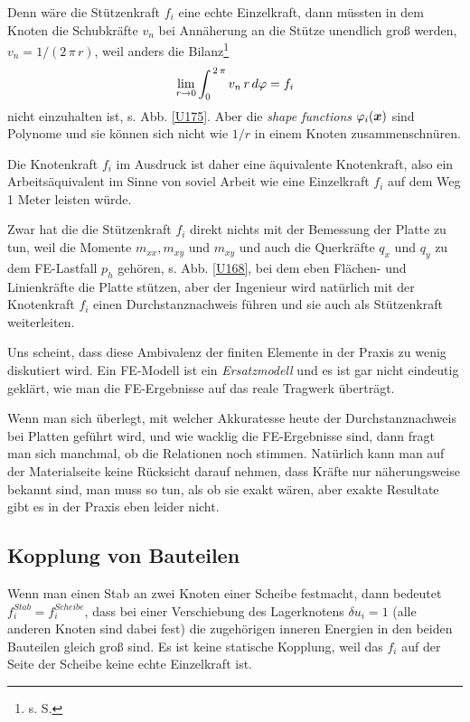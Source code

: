 Denn w\"{a}re die St\"{u}tzenkraft $f_i$ eine echte Einzelkraft, dann m\"{u}ssten in dem Knoten die Schubkr\"{a}fte $v_n$ bei Ann\"{a}herung an die St\"{u}tze unendlich gro{\ss} werden, $v_n = 1/(2\,\pi\,r)$, weil anders die Bilanz\footnote{s. S. \pageref{EinzelF}}
\begin{align}
\lim_{r \to 0} \int_0^{\,2\,\pi} v_n \,r\,d\varphi = f_i
\end{align}
nicht einzuhalten ist, s. Abb. \ref{U175}. Aber die {\em shape functions\/} $\varphi_i(\mbox{\boldmath $x$})$ sind Polynome und sie k\"{o}nnen sich nicht wie $1/r$ in einem Knoten zusammenschn\"{u}ren.

Die Knotenkraft $f_i$ im Ausdruck ist daher eine \"{a}quivalente Knotenkraft, also ein Arbeits\"{a}quivalent im Sinne von \glq soviel Arbeit wie eine Einzelkraft $f_i$ auf dem Weg 1 Meter leisten w\"{u}rde\grq{}.

Zwar hat die die St\"{u}tzenkraft $f_i$ direkt nichts mit der Bemessung der Platte zu tun, weil die Momente $m_{xx}, m_{xy}$ und $m_{xy}$ und auch die Querkr\"{a}fte $q_x$ und $q_y$ zu dem FE-Lastfall $p_h$ geh\"{o}ren, s. Abb. \ref{U168}, bei dem eben Fl\"{a}chen- und Linienkr\"{a}fte die Platte st\"{u}tzen, aber der Ingenieur wird nat\"{u}rlich mit der Knotenkraft $f_i$ einen Durchstanznachweis f\"{u}hren und sie auch als St\"{u}tzenkraft weiterleiten.

Uns scheint, dass diese Ambivalenz der finiten Elemente in der Praxis zu wenig diskutiert wird. Ein FE-Modell ist ein {\em Ersatzmodell\/} und es ist gar nicht eindeutig gekl\"{a}rt, wie man die FE-Ergebnisse auf das reale Tragwerk \"{u}bertr\"{a}gt.

Wenn man sich \"{u}berlegt,  mit welcher Akkuratesse heute der Durchstanznachweis bei Platten gef\"{u}hrt wird, und wie \glq wacklig\grq{} die FE-Ergebnisse sind, dann fragt man sich manchmal, ob die Relationen noch stimmen. Nat\"{u}rlich kann man auf der Materialseite keine R\"{u}cksicht darauf nehmen, dass Kr\"{a}fte nur n\"{a}herungsweise bekannt sind, man muss so tun, als ob sie exakt w\"{a}ren, aber exakte Resultate gibt es in der Praxis eben leider nicht.



\textcolor{sectionTitleBlue}{\section{Kopplung von Bauteilen}}
Wenn man einen Stab an zwei Knoten einer Scheibe festmacht, dann bedeutet $f_i^{Stab} = f_i^{Scheibe}$, dass bei einer Verschiebung des Lagerknotens $\delta u_i = 1$ (alle anderen Knoten sind dabei fest) die zugeh\"{o}rigen inneren Energien in den beiden Bauteilen gleich gro{\ss} sind. Es ist keine statische Kopplung, weil das $f_i$ auf der Seite der Scheibe keine echte Einzelkraft ist.

